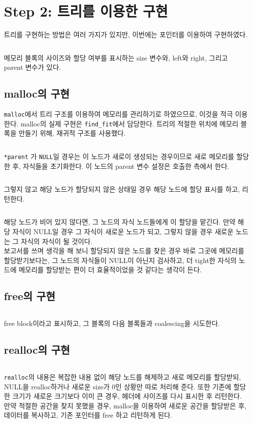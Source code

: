 \documentclass{report}
\begin{document}
\section{Step 2: 트리를 이용한 구현}

트리를 구현하는 방법은 여러 가지가 있지만, 이번에는 포인터를 이용하여 구현하였다.
 
\inputminted[firstline=35,lastline=40, linenos, breaklines]{C}{mm_old.c}

메모리 블록의 사이즈와 할당 여부를 표시하는 size 변수와, left와 right, 그리고 parent 변수가 있다.

\subsection{malloc의 구현}
\lstinline{malloc}에서 트리 구조를 이용하여 메모리를 관리하기로 하였으므로, 이것을 적극 이용한다. malloc의 실제 구현은 \lstinline{find_fit}에서 담당한다. 트리의 적절한 위치에 메모리 블록을 만들기 위해, 재귀적 구조를 사용했다.

\inputminted[firstline=94,lastline=108, linenos, breaklines]{C}{mm_old.c}
\lstinline{*parent} 가 \lstinline{NULL}일 경우는 이 노드가 새로이 생성되는 경우이므로 새로 메모리를 할당한 후, 자식들을 초기화한다. 이 노드의 parent 변수 설정은 호출한 측에서 한다.

\inputminted[firstline=109,lastline=118, linenos, breaklines]{C}{mm_old.c}
그렇지 않고 해당 노드가 할당되지 않은 상태일 경우 해당 노드에 할당 표시를 하고, 리턴한다.
\inputminted[firstline=119,lastline=138, linenos, breaklines]{C}{mm_old.c}
해당 노드가 비어 있지 않다면, 그 노드의 자식 노드들에게 이 할당을 맡긴다. 만약 해당 자식이 NULL일 경우 그 자식이 새로운 노드가 되고, 그렇지 않을 경우 새로운 노드는 그 자식의 자식이 될 것이다.
\\ 보고서를 쓰며 생각을 해 보니 할당되지 않은 노드를 찾은 경우 바로 그곳에 메모리를 할당받기보다는, 그 노드의 자식들이 NULL이 아닌지 검사하고, 더 tight한 자식의 노드에 메모리를 할당받는 편이 더 효율적이었을 것 같다는 생각이 든다.


\subsection{free의 구현}
\inputminted[firstline=359,lastline=367, linenos, breaklines]{C}{mm_old_2.c}
free block이라고 표시하고, 그 블록의 다음 블록들과 coalescing을 시도한다.

\subsection{realloc의 구현}
\inputminted[firstline=399,lastline=439, linenos, breaklines]{C}{mm_old_2.c}
\lstinline{realloc}의 내용은 복잡한 내용 없이 해당 노드를 해제하고 새로 메모리를 할당받되, NULL을 realloc하거나 새로운 size가 0인 상황만 따로 처리해 준다. 또한 기존에 할당한 크기가 새로운 크기보다 이미 큰 경우, 헤더에 사이즈를 다시 표시한 후 리턴한다. 만약 적절한 공간을 찾지 못했을 경우, malloc을 이용하여 새로운 공간을 할당받은 후, 데이터를 복사하고, 기존 포인터를 free 하고 리턴하게 된다.
\end{document}

